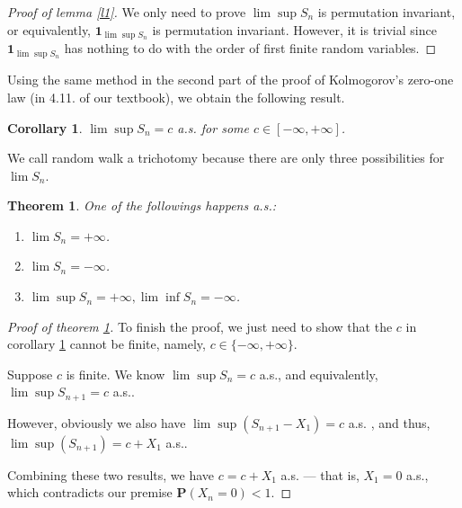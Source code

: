 \documentclass[12pt]{article}
\newcommand\pro{\mathbf{P}}
\newcommand{\ind}[1]{\mathbf{1}_{#1}}
\newtheorem{theorem}{Theorem}
\newtheorem{corollary}{Corollary}
\begin{document}
	\begin{proof}[Proof of lemma \ref{l1}]
		We only need to prove $\lim\sup S_n$ is permutation invariant, or equivalently, $\ind{\lim\sup S_n}$ is permutation invariant. However, it is trivial since $\ind{\lim\sup S_n}$ has nothing to do with the order of first finite random variables.
	\end{proof}
	
	Using the same method in the second part of the proof of Kolmogorov's zero-one law (in 4.11. of our textbook), we obtain the following result.
	
	\begin{corollary}\label{c1}
		$\lim\sup S_n=c$ a.s. for some $c\in[-\infty,+\infty]$.
	\end{corollary}
	
	We call random walk a trichotomy because there are only three possibilities for $\lim S_n$.
	
	\begin{theorem}\label{t1}
		One of the followings happens a.s.:
		\begin{enumerate}[(1)]
			\item $\lim S_n=+\infty$.
			\item $\lim S_n=-\infty$.
			\item $\lim\sup S_n=+\infty, \lim\inf S_n=-\infty$.
		\end{enumerate}
	\end{theorem}
	
	\begin{proof}[Proof of theorem \ref{t1}]
		To finish the proof, we just need to show that the $c$ in corollary \ref{c1} cannot be finite, namely, $c\in\{-\infty,+\infty\}$. 
		
		Suppose $c$ is finite. We know $\lim\sup S_n=c$ a.s., and equivalently, $
		\lim\sup S_{n+1}=c$ a.s.. 
		
		However, obviously we also have $\lim\sup (S_{n+1}-X_1)=c$ a.s. , and thus, $\lim\sup(S_{n+1})=c+X_1$ a.s.. 
		
		Combining these two results, we have $c=c+X_1$ a.s. --- that is, $X_1=0$ a.s., which contradicts our premise $\pro(X_n=0)<1$. 
		
	\end{proof}
	
\end{document}
